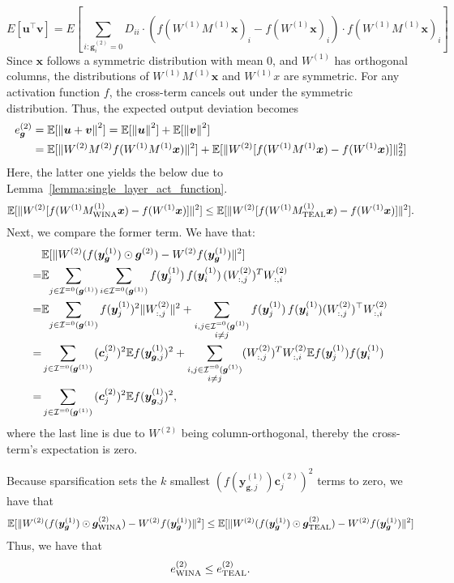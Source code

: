 $$ E\left[ \bm{u}^\top \bm{v} \right] = E\left[ \sum_{i:\bm{g}^{(2)}_i = 0} D_{ii} \cdot \left( f(W^{(1)}M^{(1)}\bm{x})_i - f(W^{(1)}\bm{x})_i \right)\cdot  f(W^{(1)}M^{(1)}\bm{x})_i \right] $$
Since $\bm{x}$ follows a symmetric distribution with mean 0, and $W^{(1)}$ has orthogonal columns, the distributions of $W^{(1)}M^{(1)}\bm{x}$ and $W^{(1)}x$ are symmetric. For any activation function $f$, the cross-term cancels out under the symmetric distribution. Thus, the expected output deviation becomes
\begin{align*}\label{equ}
	e_{\bm{g}}^{(2)} &= \E[\norm{\bm{u}+\bm{v}}^2] =\E[\norm{\bm{u}}^2]+\E[\norm{\bm{v}}^2]\\
	&= \E[\| W^{(2)}M^{(2)}f(W^{(1)}M^{(1)}\bm{x}) \|^2] + \mathbb{E}[\| W^{(2)}[f(W^{(1)}M^{(1)}\bm{x})-f(W^{(1)}\bm{x})] \|_2^2]
\end{align*}
Here, the latter one yields the below due to Lemma~\ref{lemma:single_layer_act_function}.
$$
\mathbb{E}[\| W^{(2)}[f(W^{(1)}M_\text{\algacro{}}^{(1)}\bm{x})-f(W^{(1)}\bm{x})] \|^2] \leq \mathbb{E}[\| W^{(2)}[f(W^{(1)}M_\text{TEAL}^{(1)}\bm{x})-f(W^{(1)}\bm{x})] \|^2].
$$
Next, we compare the former term. We have that:
\begin{align*}
	&\mathbb{E}[\| W^{(2)} (f(\bm{y}_{\bm{g}}^{(1)}) \odot \bm{g}^{(2)}) - W^{(2)} f(\bm{y}_{\bm{g}}^{(1)}) \|^2] \\
	= &\E{\sum_{j\in \mathcal{I}^{=0}(\bm{g}^{(1)})}\sum_{i\in \mathcal{I}^{=0}(\bm{g}^{(1)})} f(\bm{y}_j^{(1)})\,f(\bm{y}_i^{(1)})\,(W_{:,j}^{(2)})^T W_{:,i}^{(2)}}\\
	= & \E{\sum_{j\in \mathcal{I}^{=0}(\bm{g}^{(1)})} f(\bm{y}_j^{(1)})^2\|W_{:,j}^{(2)}\|^2} 
	+ \sum_{\substack{i,j\in \mathcal{I}^{=0}(\bm{g}^{(1)})\\i\neq j}} f(\bm{y}_j^{(1)})\,f(\bm{y}_i^{(1)})(W_{:,j}^{(2)})^\top W_{:,i}^{(2)} \\
	= & \sum_{j\in \mathcal{I}^{=0}(\bm{g}^{(1)})}{(\bm{c}_j^{(2)})^2\E{f(\bm{y}_{\bm{g},j}^{(1)})^2}} + \sum_{\substack{i,j\in \mathcal{I}^{=0}(\bm{g}^{(1)})\\i\neq j}}({W_{:,j}^{(2)})^T W_{:,i}^{(2)}\E{f(\bm{y}_j^{(1)})f(\bm{y}_i^{(1)}})}\\
	= & \sum_{j\in \mathcal{I}^{=0}(\bm{g}^{(1)})}{(\bm{c}_j^{(2)})^2\E{f(\bm{y}_{\bm{g},j}^{(1)})^2}},
\end{align*}
where the last line is due to $W^{(2)}$ being column-orthogonal, thereby the cross-term's expectation is zero.

Because \algacro{} sparsification sets the $k$ smallest $(f(\bm{y}_{\bm{g}, j}^{(1)})\bm{c}_j^{(2)})^2$ terms to zero, we have that 
$$
\mathbb{E}[\| W^{(2)} (f(\bm{y}_{\bm{g}}^{(1)}) \odot \bm{g}_\text{\algacro{}}^{(2)}) - W^{(2)} f(\bm{y}_{\bm{g}}^{(1)}) \|^2] \le \mathbb{E}[\| W^{(2)} (f(\bm{y}_{\bm{g}}^{(1)}) \odot \bm{g}_\text{TEAL}^{(2)}) - W^{(2)} f(\bm{y}_{\bm{g}}^{(1)}) \|^2]
$$
Thus, we have that 
$$
e_\text{\algacro{}}^{(2)}\leq e_\text{TEAL}^{(2)}.
$$


